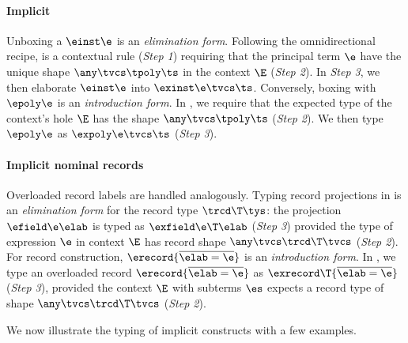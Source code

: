 \documentclass[acmsmall,screen,nonacm%
\Anonymous{,anonymous}{}%
\Final{}{,review}%
]{acmart}
\providecommand{\DIFdel}[1]{\protect\cbdelete{\protect\color{red}#1}\protect\cbdelete} %
\providecommand{\DIFaddbegin}{} %
\providecommand{\DIFaddend}{} %
\providecommand{\DIFdelbegin}{} %
\providecommand{\DIFdelend}{} %
\begin{document}
\paragraph{Implicit \DIFdelbegin \DIFdel{polytypes}\DIFdelend \DIFaddbegin \polytypes\DIFaddend }

Unboxing a \DIFdelbegin \DIFdel{polytype }\DIFdelend \DIFaddbegin \polytype \DIFaddend $\einst \e$ is an \emph{elimination form}. Following the
omnidirectional recipe,  is a contextual rule (\emph{Step 1})
requiring that the principal term $\e$ have the unique shape $\any \tvcs \tpoly
\ts$ in the context $\E$ (\emph{Step 2}). In \emph{Step 3}, we then elaborate
$\einst \e$ into $\exinst \e \tvcs \ts$.
%
Conversely, boxing with $\epoly \e$ is an \emph{introduction form}. In
, we require that the expected type of the context's hole $\E$ has
the shape $\any \tvcs \tpoly \ts$ (\emph{Step 2}). We then type $\epoly \e$ as
$\expoly \e \tvcs \ts$ (\emph{Step 3}).


\paragraph{Implicit nominal records}

Overloaded record labels are handled analogously.
%
Typing record projections in  is an \emph{elimination
  form} for the record type $\trcd \T \tys$: the projection $\efield \e \elab$
is typed as $\exfield \e \T \elab$ (\emph{Step 3}) provided the
type of expression $\e$ in context $\E$ has record shape
$\any \tvcs \trcd \T \tvcs$ (\emph{Step 2}).
%
For record construction, $\erecord {\overline{\elab = \e}}$ is an
\emph{introduction form}. In , we type an overloaded record
$\erecord {\overline{\elab = \e}}$ as $\exrecord \T {\overline{\elab = \e}}$
(\emph{Step 3}), provided the context $\E$ with subterms $\es$ expects a
record type of shape $\any \tvcs \trcd \T \tvcs$ (\emph{Step 2}).

We now illustrate the typing of implicit constructs with a few examples.
\end{document}
